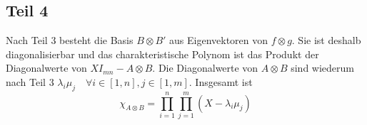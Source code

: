 \documentclass[10pt,a4paper]{article}
\begin{document}
\subsection*{Teil 4}

Nach Teil 3 besteht die Basis $B \otimes B'$ aus Eigenvektoren von $f \otimes g$.
Sie ist deshalb diagonalisierbar und das charakteristische Polynom ist das Produkt der Diagonalwerte von $X I_{mn} - A \otimes B$.
Die Diagonalwerte von $A \otimes B$ sind wiederum nach Teil 3 $\lambda_{i} \mu_{j} \quad \forall i \in [1, n], j \in [1, m]$.
Insgesamt ist
\begin{equation}
\chi_{A \otimes B} = \prod_{i = 1}^{n} \prod_{j = 1}^{m} (X - \lambda_{i} \mu_{j})
\end{equation}
\end{document}
